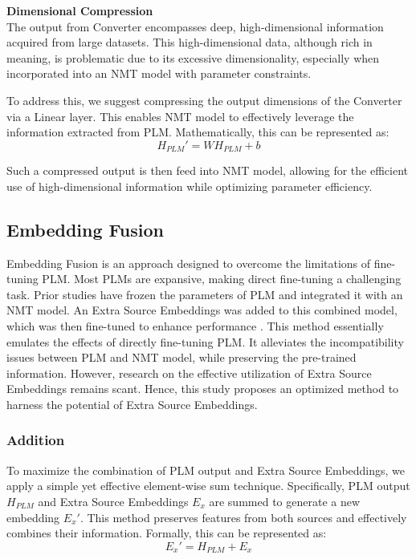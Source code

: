 \documentclass[conference]{IEEEtran}
\begin{document}
\noindent \textbf{Dimensional Compression}\\
The output from Converter encompasses deep, high-dimensional information acquired from large datasets. This high-dimensional data, although rich in meaning, is problematic due to its excessive dimensionality, especially when incorporated into an NMT model with parameter constraints.

To address this, we suggest compressing the output dimensions of the Converter via a Linear layer. This enables NMT model to effectively leverage the information extracted from PLM. Mathematically, this can be represented as:
\begin{equation}
H_{PLM}' = W H_{PLM} + b
\end{equation}


Such a compressed output is then feed into NMT model, allowing for the efficient use of high-dimensional information while optimizing parameter efficiency.

\subsection{Embedding Fusion}
Embedding Fusion is an approach designed to overcome the limitations of fine-tuning PLM. Most PLMs are expansive, making direct fine-tuning a challenging task. Prior studies have frozen the parameters of PLM and integrated it with an NMT model. An Extra Source Embeddings was added to this combined model, which was then fine-tuned to enhance performance \cite{Ding2018}. This method essentially emulates the effects of directly fine-tuning PLM. It alleviates the incompatibility issues between PLM and NMT model, while preserving the pre-trained information. However, research on the effective utilization of Extra Source Embeddings remains scant. Hence, this study proposes an optimized method to harness the potential of Extra Source Embeddings.
\subsubsection{Addition}
To maximize the combination of PLM output and Extra Source Embeddings, we apply a simple yet effective element-wise sum technique. Specifically, PLM output \(H_{PLM}\) and Extra Source Embeddings \(E_x\) are summed to generate a new embedding \(E_x'\). This method preserves features from both sources and effectively combines their information. Formally, this can be represented as:
\begin{equation}
E_x' = H_{PLM} + E_x
\end{equation}
\end{document}
